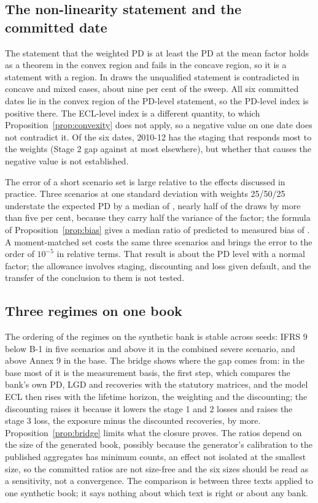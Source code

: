 \subsection{The non-linearity statement and the committed date}
\label{sec:disc-nonlinearity}

The statement that the weighted PD is at least the PD at the mean factor holds as a theorem in the convex region and fails in the concave region, so it is a statement with a region.
In \efourDraws{} draws the unqualified statement is contradicted in \efourConcaveNeg{} concave and \efourMixedNeg{} mixed cases, about nine per cent of the sweep.
All six committed dates lie in the convex region of the PD-level statement, so the PD-level index is positive there.
The ECL-level index is a different quantity, to which Proposition~\ref{prop:convexity} does not apply, so a negative value on one date does not contradict it.
Of the six dates, 2010-12 has the staging that responds most to the weights (Stage 2 gap \efourGapTen{} against at most \efourGapOther{} elsewhere), but whether that causes the negative value is not established.

The error of a short scenario set is large relative to the effects discussed in practice.
Three scenarios at one standard deviation with weights 25/50/25 understate the expected PD by a median of \efourAdhocMed{}, nearly half of the draws by more than five per cent, because they carry half the variance of the factor; the formula of Proposition~\ref{prop:bias} gives a median ratio of predicted to measured bias of \efourBiasMedian{}.
A moment-matched set costs the same three scenarios and brings the error to the order of $10^{-5}$ in relative terms.
That result is about the PD level with a normal factor; the allowance involves staging, discounting and loss given default, and the transfer of the conclusion to them is not tested.

\subsection{Three regimes on one book}
\label{sec:disc-regimes}

The ordering of the regimes on the synthetic bank is stable across seeds: IFRS 9 below B-1 in five scenarios and above it in the combined severe scenario, and above Annex 9 in the base.
The bridge shows where the gap comes from: in the base most of it is the measurement basis, the first step, which compares the bank's own PD, LGD and recoveries with the statutory matrices, and the model ECL then rises with the lifetime horizon, the weighting and the discounting; the discounting raises it because it lowers the stage 1 and 2 losses and raises the stage 3 loss, the exposure minus the discounted recoveries, by more.
Proposition~\ref{prop:bridge} limits what the closure proves.
The ratios depend on the size of the generated book, possibly because the generator's calibration to the published aggregates has minimum counts, an effect not isolated at the smallest size, so the committed ratios are not size-free and the six sizes should be read as a sensitivity, not a convergence.
The comparison is between three texts applied to one synthetic book; it says nothing about which text is right or about any bank.
